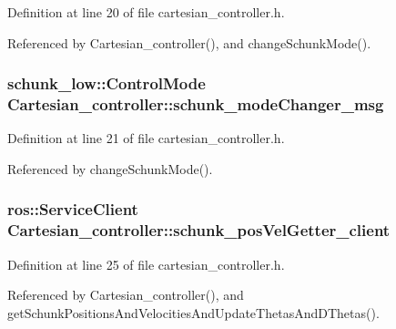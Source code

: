 Definition at line 20 of file cartesian\-\_\-controller.\-h.



Referenced by Cartesian\-\_\-controller(), and change\-Schunk\-Mode().

\hypertarget{classCartesian__controller_a960d66580ba058d3337c89bdf8099948}{
\subsubsection[{schunk\-\_\-mode\-Changer\-\_\-msg}]{\setlength{\rightskip}{0pt plus 5cm}schunk\-\_\-low\-::\-Control\-Mode Cartesian\-\_\-controller\-::schunk\-\_\-mode\-Changer\-\_\-msg\hspace{0.3cm}{\ttfamily [protected]}}}\label{classCartesian__controller_a960d66580ba058d3337c89bdf8099948}


Definition at line 21 of file cartesian\-\_\-controller.\-h.



Referenced by change\-Schunk\-Mode().

\hypertarget{classCartesian__controller_a5c1d9386bc5f219f2edc0d5d1b21f0da}{
\subsubsection[{schunk\-\_\-pos\-Vel\-Getter\-\_\-client}]{\setlength{\rightskip}{0pt plus 5cm}ros\-::\-Service\-Client Cartesian\-\_\-controller\-::schunk\-\_\-pos\-Vel\-Getter\-\_\-client\hspace{0.3cm}{\ttfamily [protected]}}}\label{classCartesian__controller_a5c1d9386bc5f219f2edc0d5d1b21f0da}


Definition at line 25 of file cartesian\-\_\-controller.\-h.



Referenced by Cartesian\-\_\-controller(), and get\-Schunk\-Positions\-And\-Velocities\-And\-Update\-Thetas\-And\-D\-Thetas().


